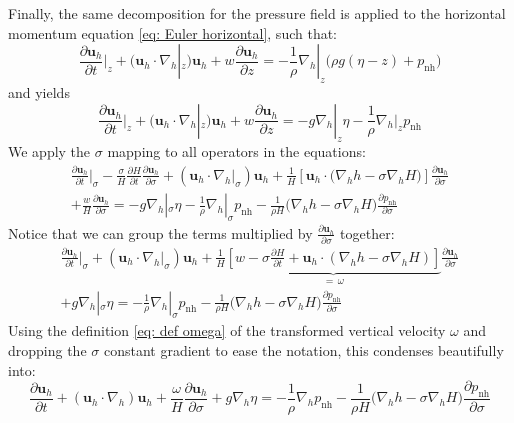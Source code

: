 \documentclass{article}
\newcommand{\uh}{\mathbf{u}_h}
\newcommand{\nablah}{\nabla_h}
\newcommand{\pnh}{p_{\text{nh}}}
\newcommand{\ddt}[1]{\frac{\partial #1}{\partial t}}
\newcommand{\dds}[1]{\frac{\partial #1}{\partial \sigma}}
\begin{document}
Finally, the same decomposition for the pressure field is applied to the horizontal momentum equation \eqref{eq: Euler horizontal}, such that:
$$\ddt{\uh}\bigg|_z + (\uh \cdot \nablah|_z)\uh + w\frac{\partial \uh}{\partial z} = -\frac{1}{\rho}\nablah|_z \big(\rho g (\eta - z) + \pnh\big)$$
and yields
$$\ddt{\uh}\bigg|_z + (\uh \cdot \nablah|_z)\uh + w\frac{\partial \uh}{\partial z} = - g\nablah|_z \eta -\frac{1}{\rho}\nablah|_z \pnh$$
We apply the $\sigma$ mapping to all operators in the equations:
\begin{multline*}
    \ddt{\uh}\bigg|_\sigma - \frac{\sigma}{H}\ddt{H}\dds{\uh}+(\uh \cdot \nablah|_\sigma)\uh + \frac{1}{H}\left[ \uh \cdot \Big(\nablah h - \sigma \nablah H\Big) \right] \dds{\uh} \\
    + \frac{w}{H}\dds{\uh} = - g\nablah|_\sigma \eta - \frac{1}{\rho}\nablah|_\sigma \pnh - \frac{1}{\rho H}\Big(\nablah h - \sigma \nablah H\Big)\dds{\pnh}
\end{multline*}
Notice that we can group the terms multiplied by $\dds{\uh}$ together:
\begin{multline*}
    \ddt{\uh}\bigg|_\sigma +(\uh \cdot \nablah|_\sigma)\uh + \frac{1}{H}\underbrace{\left[ w -\sigma\ddt{H} + \uh \cdot \left( \nablah h - \sigma \nablah H\right) \right]}_{= \,\omega} \dds{\uh} \\
     +g\nablah|_\sigma \eta = - \frac{1}{\rho}\nablah|_\sigma \pnh - \frac{1}{\rho H}\Big(\nablah h - \sigma \nablah H\Big)\dds{\pnh}
\end{multline*}
Using the definition \eqref{eq: def omega} of the transformed vertical velocity $\omega$ and dropping the $\sigma$ constant gradient to ease the notation, this condenses beautifully into:
\begin{equation*}
    \boxed{\ddt{\uh} +(\uh \cdot \nablah)\uh + \frac{\omega}{H}\dds{\uh} 
     +g\nablah \eta = - \frac{1}{\rho}\nablah \pnh - \frac{1}{\rho H}\Big(\nablah h - \sigma \nablah H\Big)\dds{\pnh}}
\end{equation*}
\end{document}
